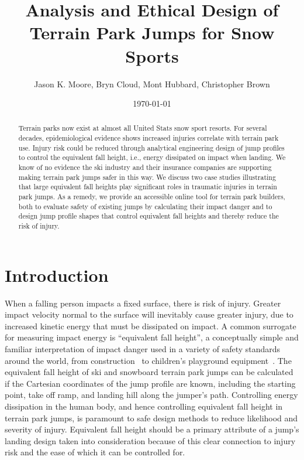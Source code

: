 \documentclass{article}
\title{Analysis and Ethical Design of Terrain Park Jumps for Snow Sports}
\author{Jason K. Moore, Bryn Cloud, Mont Hubbard, Christopher Brown}
\date{\today}
\begin{document}
\maketitle

\begin{abstract}
  Terrain parks now exist at almost all United Stats snow sport resorts. For
  several decades, epidemiological evidence shows increased injuries correlate
  with terrain park use. Injury risk could be reduced through analytical
  engineering design of jump profiles to control the equivalent fall height,
  i.e., energy dissipated on impact when landing. We know of no evidence the
  ski industry and their insurance companies are supporting making terrain park
  jumps safer in this way. We discuss two case studies illustrating that large
  equivalent fall heights play significant roles in traumatic injuries in
  terrain park jumps. As a remedy, we provide an accessible online tool for
  terrain park builders, both to evaluate safety of existing jumps by
  calculating their impact danger and to design jump profile shapes that
  control equivalent fall heights and thereby reduce the risk of injury.
\end{abstract}

\section{Introduction}
%
When a falling person impacts a fixed surface, there is risk of injury. Greater
impact velocity normal to the surface will inevitably cause greater injury, due
to increased kinetic energy that must be dissipated on impact. A common
surrogate for measuring impact energy is ``equivalent fall height'', a
conceptually simple and familiar interpretation of impact danger used in a
variety of safety standards around the world, from construction~\cite{OSHA2021}
to children's playground equipment~\cite{Chalmers1996}. The equivalent fall
height of ski and snowboard terrain park jumps can be
calculated~\cite{McNeil2012} if the Cartesian coordinates of the jump profile
are known, including the starting point, take off ramp, and landing hill along
the jumper's path. Controlling energy dissipation in the human body, and hence
controlling equivalent fall height in terrain park jumps, is paramount to safe
design methods to reduce likelihood and severity of injury. Equivalent fall
height should be a primary attribute of a jump's landing design taken into
consideration because of this clear connection to injury risk and the ease of
which it can be controlled for.
\end{document}
